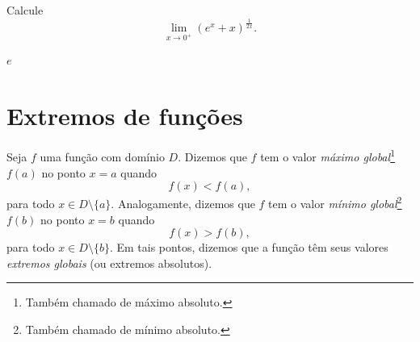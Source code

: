 \begin{exer}
  Calcule
  \begin{equation}
    \lim_{x\to 0^+} \left(e^x + x\right)^{\frac{1}{2x}}.
  \end{equation}
\end{exer}
\begin{resp}
  $e$
\end{resp}

\section{Extremos de funções}\label{cap_apderiv_sec_extfun}

Seja $f$ uma função com domínio $D$. Dizemos que $f$ tem o valor \emph{máximo global}\footnote{Também chamado de máximo absoluto.} $f(a)$ no ponto $x=a$ quando
\begin{equation}
  f(x) < f(a),
\end{equation}
para todo $x\in D\setminus\{a\}$. Analogamente, dizemos que $f$ tem o valor \emph{mínimo global}\footnote{Também chamado de mínimo absoluto.} $f(b)$ no ponto $x=b$ quando
\begin{equation}
  f(x) > f(b),
\end{equation}
para todo $x\in D\setminus\{b\}$. Em tais pontos, dizemos que a função têm seus valores \emph{extremos globais} (ou extremos absolutos).


